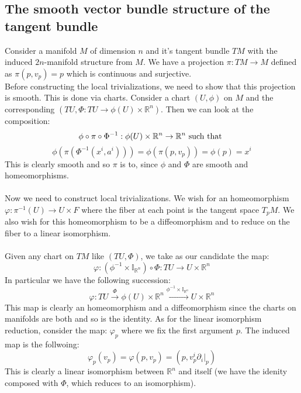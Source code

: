 \documentclass[12pt,a4paper]{report}
\theoremstyle{definition}
\theoremstyle{Theorem}
\theoremstyle{definition}
\theoremstyle{definition}
\theoremstyle{definition}
\begin{document}
		\subsection{The smooth vector bundle structure of the tangent bundle}
		Consider a manifold $M$ of dimension $n$ and it's tangent bundle $TM$ with the induced $2n$-manifold structure from $M$. We have a projection $\pi:TM\rightarrow M$ defined as $\pi(p,v_p)=p$ which is continuous and surjective. 
		\\
		Before constructing the local trivializations, we need to show that this projection is smooth. This is done via charts. Consider a chart $(U,\phi)$ on $M$ and the corresponding $(TU,\Phi:TU\rightarrow \phi(U)\times \mathbb{R}^n)$. Then we can look at the composition:
		$$\phi\circ \pi\circ \Phi^{-1}:\phi(U)\times \mathbb{R}^n\rightarrow \mathbb{R}^n \hbox{ such that }$$ 
		$$\phi(\pi(\Phi^{-1}(x^i,a^i)))=\phi(\pi(p,v_p))=\phi(p)=x^i$$
		This is clearly smooth and so $\pi$ is to, since $\phi$ and $\Phi$ are smooth and homeomorphisms.\\
		\\
		Now we need to construct local trivializations. We wish for an homeomorphism $\varphi:\pi^{-1}(U)\rightarrow U\times F$ where the fiber at each point is the tangent space $T_pM$. We also wish for this homeomorphism to be a diffeomorphism and to reduce on the fiber to a linear isomorphism.\\
		\\
		Given any chart on $TM$ like $(TU,\Phi)$, we take as our candidate the map: 
		$$\varphi:(\phi^{-1}\times \mathbb{I}_{\mathbb{R}^n})\circ \Phi:TU\rightarrow U\times \mathbb{R}^n$$
		In particular we have the following succession:
		$$\varphi:TU\xrightarrow{\text{$\Phi$}} \phi(U)\times \mathbb{R}^n\xrightarrow{\text{$\phi^{-1}\times \mathbb{I}_{\mathbb{R}^n}$}}U\times \mathbb{R}^n$$
		This map is clearly an homeomorphism and a diffeomorphism since the charts on manifolds are both and so is the identity. As for the linear isomorphism reduction, consider the map:
		$\varphi_p$ where we fix the first argument $p$. The induced map is the follwoing:
		$$\varphi_p(v_p)=\varphi(p,v_p)=(p,v^i_p\partial_i|_p)$$
		This is clearly a linear isomorphism between $\mathbb{R}^n$ and itself (we have the idenity composed with $\Phi$, which reduces to an isomorphism).
\end{document}
